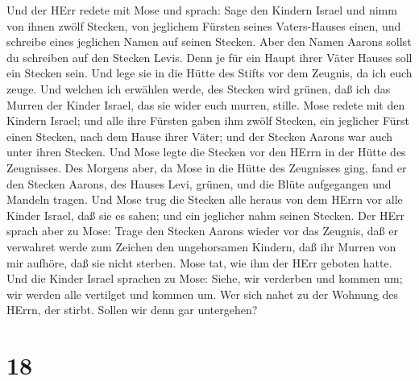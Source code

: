  Und der HErr redete mit Mose und sprach:  Sage
den Kindern Israel und nimm von ihnen zwölf Stecken, von jeglichem
Fürsten seines Vaters-Hauses einen, und schreibe eines jeglichen Namen
auf seinen Stecken.  Aber den Namen Aarons sollst du
schreiben auf den Stecken Levis. Denn je für ein Haupt ihrer Väter
Hauses soll ein Stecken sein.  Und lege sie in die Hütte des
Stifts vor dem Zeugnis, da ich euch zeuge.  Und welchen ich
erwählen werde, des Stecken wird grünen, daß ich das Murren der Kinder
Israel, das sie wider euch murren, stille.  Mose redete mit
den Kindern Israel; und alle ihre Fürsten gaben ihm zwölf Stecken, ein
jeglicher Fürst einen Stecken, nach dem Hause ihrer Väter; und der
Stecken Aarons war auch unter ihren Stecken.  Und Mose legte
die Stecken vor den HErrn in der Hütte des Zeugnisses.  Des
Morgens aber, da Mose in die Hütte des Zeugnisses ging, fand er den
Stecken Aarons, des Hauses Levi, grünen, und die Blüte aufgegangen und
Mandeln tragen.  Und Mose trug die Stecken alle heraus von
dem HErrn vor alle Kinder Israel, daß sie es sahen; und ein jeglicher
nahm seinen Stecken.  Der HErr sprach aber zu Mose: Trage
den Stecken Aarons wieder vor das Zeugnis, daß er verwahret werde zum
Zeichen den ungehorsamen Kindern, daß ihr Murren von mir aufhöre, daß
sie nicht sterben.  Mose tat, wie ihm der HErr geboten
hatte.  Und die Kinder Israel sprachen zu Mose: Siehe, wir
verderben und kommen um; wir werden alle vertilget und kommen um.
 Wer sich nahet zu der Wohnung des HErrn, der stirbt.
Sollen wir denn gar untergehen?

\hypertarget{section-17}{%
\section{18}\label{section-17}}

